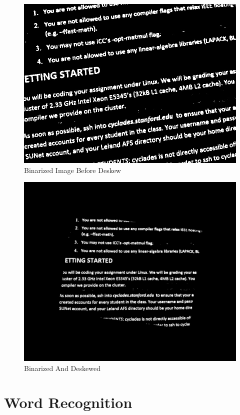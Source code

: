 \documentclass[conference]{IEEEtran}
\begin{document}
\begin{figure}
\center
\includegraphics[scale=0.15]{binarized.jpg}
\caption{Binarized Image Before Deskew}
\label{binarized}
\end{figure}

\begin{figure}
\center
\includegraphics[scale=0.15]{deskewedImage.jpg}
\caption{Binarized And Deskewed}
\label{deskewed}
\end{figure}

\section{Word Recognition}
\end{document}
